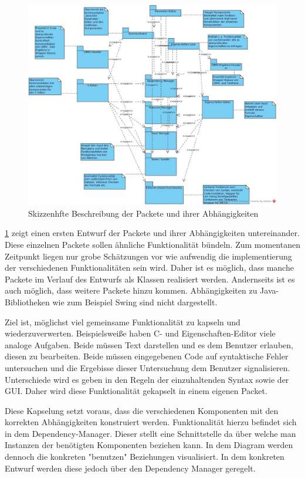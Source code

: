\documentclass[a4paper]{scrreprt}
\begin{document}
\begin{figure}[H]
\includegraphics[scale=0.4]{architecture_first_scetch.jpg}
\caption{Skizzenhfte Beschreibung der Packete und ihrer Abhängigkeiten}
\label{Packet-scetch}
\end{figure}

\ref{Packet-scetch} zeigt einen ersten Entwurf der Packete und ihrer Abhängigkeiten untereinander. Diese einzelnen Packete sollen ähnliche Funktionalität bündeln. Zum momentanen Zeitpunkt liegen nur grobe Schätzungen vor wie aufwendig die implementierung der verschiedenen Funktionalitäten sein wird. Daher ist es möglich, dass manche Packete im Verlauf des Entwurfs als Klassen realisiert werden. Andernseits ist es auch möglich, dass weitere Packete hinzu kommen. Abhängigkeiten zu Java-Bibliotheken wie zum Beispiel Swing sind nicht dargestellt.

Ziel ist, möglichst  viel gemeinsame Funktionalität zu kapseln und wiederzuverwerten. Beispielsweiße haben C- und Eigenschaften-Editor viele analoge Aufgaben. Beide müssen Text darstellen und es dem Benutzer erlauben, diesen zu bearbeiten. Beide müssen eingegebenen Code auf syntaktische Fehler untersuchen und die Ergebisse dieser Untersuchung dem Benutzer signalisieren. Unterschiede wird es geben in den Regeln der einzuhaltenden Syntax sowie der \ac{GUI}. Daher wird diese Funktionalität gekapselt in einem eigenen Packet. 

Diese Kapselung setzt voraus, dass die verschiedenen Komponenten mit den korrekten Abhängigkeiten konstruiert werden. Funktionalität hierzu befindet sich in dem Dependency-Manager. Dieser stellt eine Schnittstelle da über welche man Instanzen der benötigten Komponenten beziehen kann. In dem Diagram werden dennoch die konkreten "benutzen" Beziehungen visualisiert. In dem konkreten Entwurf werden diese jedoch über den Dependency Manager geregelt. 
\end{document}
